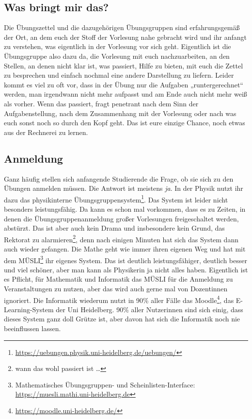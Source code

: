 \subsection{Was bringt mir das?}
Die Übungszettel und die dazugehörigen Übungsgruppen sind erfahrungsgemäß der Ort, an dem euch der Stoff der Vorlesung nahe gebracht wird und ihr anfangt zu verstehen, was eigentlich in der Vorlesung vor sich geht. Eigentlich ist die Übungsgruppe also dazu da, die Vorlesung mit euch nachzuarbeiten, an den Stellen, an denen nicht klar ist, was passiert, Hilfe zu bieten, mit euch die Zettel zu besprechen und einfach nochmal eine andere Darstellung zu liefern. Leider kommt es viel zu oft vor, dass in der Übung nur die Aufgaben „runtergerechnet“ werden, man irgendwann nicht mehr aufpasst und am Ende auch nicht mehr weiß als vorher. Wenn das passiert, fragt penetrant nach dem Sinn der Aufgabenstellung, nach dem Zusammenhang mit der Vorlesung oder nach was euch sonst noch so durch den Kopf geht. Das ist eure einzige Chance, noch etwas aus der Rechnerei zu lernen.

\subsection{Anmeldung}
Ganz häufig stellen sich anfangende Studierende die Frage, ob sie sich zu den Übungen anmelden müssen. Die Antwort ist meistens \emph{ja}. In der Physik nutzt ihr dazu das physikinterne Übungsgruppensystem\footnote{\url{https://uebungen.physik.uni-heidelberg.de/uebungen/}}. Das System ist leider nicht besonders leistungsfähig. Da kann es schon mal vorkommen, dass es zu Zeiten, in denen die Übungsgruppenanmeldung großer Vorlesungen freigeschaltet werden, abstürzt. Das ist aber auch kein Drama und insbesondere kein Grund, das Rektorat zu alarmieren\footnote{wann das wohl passiert ist \dots}, denn nach einigen Minuten hat sich das System dann auch wieder gefangen. Die Mathe geht wie immer ihren eigenen Weg  und hat mit dem MÜSLI\footnote{Mathematisches Übungsgruppen- und Scheinlisten-Interface: \url{https://muesli.mathi.uni-heidelberg.de}} ihr eigenes System. Das ist deutlich leistungsfähiger, deutlich besser und viel schöner, aber man kann als Physikerin ja nicht alles haben. Eigentlich ist es Pflicht, für Mathematik und Informatik das MÜSLI für die Anmeldung zu Veranstaltungen zu nutzen, aber das wird auch gerne mal von Dozentinnen ignoriert. Die Informatik wiederum nutzt in 90\% aller Fälle das Moodle\footnote{\url{https://moodle.uni-heidelberg.de/}}, das E-Learning-System der Uni Heidelberg. 90\% aller Nutzerinnen sind sich einig, dass dieses System ganz doll Grütze ist, aber davon hat sich die Informatik noch nie beeinflussen lassen.

